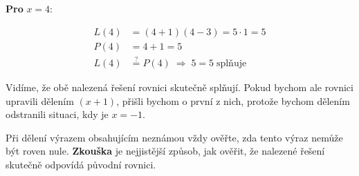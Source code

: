 \documentclass[12pt,a4paper]{article}
\begin{document}
\medskip
\textbf{Pro } $x = 4$:

\begin{align*}
L(4) &= (4 + 1)(4 - 3) = 5 \cdot 1 = 5\\
P(4) &= 4 + 1 = 5\\
L(4) &\stackrel{?}{=} P(4) \;\Rightarrow\; 5 = 5 \;\text{splňuje}
\end{align*}

\noindent
Vidíme, že obě nalezená řešení rovnici skutečně splňují.  
Pokud bychom ale rovnici upravili dělením $(x + 1)$, přišli bychom o první z nich,
protože bychom dělením odstranili situaci, kdy je $x = -1$.

\begin{notebox}
Při dělení výrazem obsahujícím neznámou vždy ověřte, zda tento výraz nemůže být roven nule.  
\textbf{Zkouška} je nejjistější způsob, jak ověřit, že nalezené řešení skutečně odpovídá původní rovnici.
\end{notebox}
\end{document}
